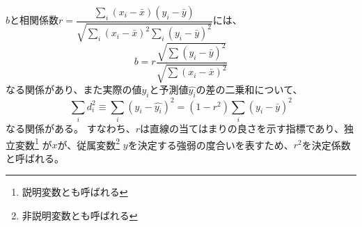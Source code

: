 $b$と相関係数$r=\dfrac{\sum_i (x_i - \bar{x})(y_i - \bar{y})}{\sqrt{\sum_i (x_i - \bar{x})^2 \sum_i (y_i - \bar{y})^2}}$には、
\begin{equation}
	b = r \dfrac{\sqrt{\sum \left(y_i - \bar{y}\right)^2}}{\sqrt{\sum \left(x_i - \bar{x}\right)^2}}
\end{equation}
なる関係があり、また実際の値$y_i$と予測値$\hat{y_i}$の差の二乗和について、
\begin{equation}
	\sum_i d_i^2 \equiv \sum_i \left(y_i - \hat{y_i}\right)^2 = \left(1 - r^2\right) \sum_i \left(y_i - \bar{y}\right)^2
\end{equation}
なる関係がある。
すなわち、$r$は直線の当てはまりの良さを示す指標であり、独立変数\footnote{
	説明変数とも呼ばれる
}
が$x$が、従属変数\footnote{
	非説明変数とも呼ばれる
}
$y$を決定する強弱の度合いを表すため、$r^2$を決定係数と呼ばれる。

